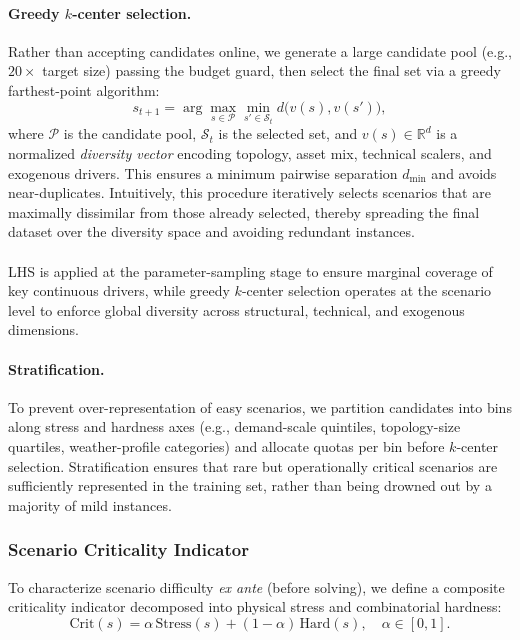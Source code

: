 \documentclass{article}
\begin{document}
\paragraph{Greedy $k$-center selection.}
Rather than accepting candidates online, we generate a large candidate pool (e.g., $20 \times$ target size) passing the budget guard, then select the final set via a greedy farthest-point algorithm:
\begin{equation}
s_{t+1} = \arg\max_{s \in \mathcal{P}} \min_{s' \in \mathcal{S}_t} d\bigl(v(s), v(s')\bigr),
\end{equation}
where $\mathcal{P}$ is the candidate pool, $\mathcal{S}_t$ is the selected set, and $v(s) \in \mathbb{R}^d$ is a normalized \emph{diversity vector} encoding topology, asset mix, technical scalers, and exogenous drivers. This ensures a minimum pairwise separation $d_{\min}$ and avoids near-duplicates. Intuitively, this procedure iteratively selects scenarios that are maximally dissimilar from those already selected, thereby spreading the final dataset over the diversity space and avoiding redundant instances.


\paragraph{}
LHS is applied at the parameter-sampling stage to ensure marginal coverage of key continuous drivers, while greedy $k$-center selection operates at the scenario level to enforce global diversity across structural, technical, and exogenous dimensions.

\paragraph{Stratification.}
To prevent over-representation of easy scenarios, we partition candidates into bins along stress and hardness axes (e.g., demand-scale quintiles, topology-size quartiles, weather-profile categories) and allocate quotas per bin before $k$-center selection. Stratification ensures that rare but operationally critical scenarios are sufficiently represented in the training set, rather than being drowned out by a majority of mild instances.


\subsubsection{Scenario Criticality Indicator}
\label{sec:criticality}

To characterize scenario difficulty \emph{ex ante} (before solving), we define a composite criticality indicator decomposed into physical stress and combinatorial hardness:
\begin{equation}
\mathrm{Crit}(s) = \alpha \, \mathrm{Stress}(s) + (1-\alpha) \, \mathrm{Hard}(s), \quad \alpha \in [0,1].
\end{equation}
\end{document}
